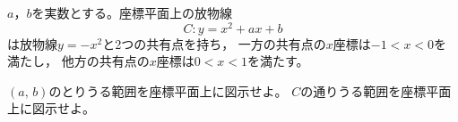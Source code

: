 \documentclass[../../main.tex]{subfiles}
\begin{document}
$a$，$b$を実数とする。座標平面上の放物線
\[ C:y=x^2+ax+b \]
は放物線$y=-x^2$と2つの共有点を持ち，
一方の共有点の$x$座標は$-1<x<0$を満たし，
他方の共有点の$x$座標は$0<x<1$を満たす。
\begin{enumerate}
  $(a, \, b)$のとりうる範囲を座標平面上に図示せよ。
  $C$の通りうる範囲を座標平面上に図示せよ。
\end{enumerate}
\end{document}

